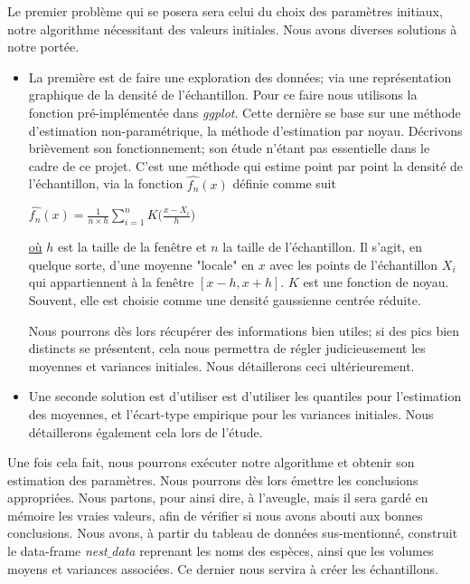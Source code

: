 \documentclass[frenchb]{report}
\newcommand{\1}{\mathbbm{1}}
\theoremstyle{definition}\newtheorem{defn}{Définition}
\theoremstyle{definition}\newtheorem{exm}{Exemple}
\theoremstyle{definition}\newtheorem{nota}{Notation}
\theoremstyle{definition}\newtheorem{rem}{Remarque}
\begin{document}
Le premier problème qui se posera sera celui du choix des paramètres initiaux, notre algorithme nécessitant des valeurs initiales. Nous avons diverses solutions à notre portée.
\begin{itemize}[label=\adfflowerleft]
\item La première est de faire une exploration des données; via une représentation graphique de la densité de l'échantillon. Pour ce faire nous utilisons la fonction pré-implémentée dans \textit{ggplot}. Cette dernière se base sur une méthode d'estimation non-paramétrique, la méthode d'estimation par noyau. Décrivons brièvement son fonctionnement; son étude n'étant pas essentielle dans le cadre de ce projet. C'est une méthode qui estime point par point la densité de l'échantillon, via la fonction $\widehat{f_n}(x)$ définie comme suit

\begin{center}
$
\widehat{f_n}(x) = \displaystyle \frac{1}{n\times h} \sum_{i=1}^n K\Big(\frac{x - X_i}{h}\Big)
$
\end{center}
\underline{où} $h$ est la taille de la fenêtre et $n$ la taille de l'échantillon. Il s'agit, en quelque sorte, d'une moyenne "locale" en $x$ avec les points de l'échantillon $X_i$ qui appartiennent à la fenêtre $[x-h, x+h]$. $K$ est une fonction de noyau. Souvent, elle est choisie comme une densité gaussienne centrée réduite.

Nous pourrons dès lors récupérer des informations bien utiles; si des pics bien distincts se présentent, cela nous permettra de régler judicieusement les moyennes et variances initiales. Nous détaillerons ceci ultérieurement. \newline
\item Une seconde solution est d'utiliser est d'utiliser les quantiles pour l'estimation des moyennes, et l'écart-type empirique pour les variances initiales. Nous détaillerons également cela lors de l'étude.
\end{itemize}

Une fois cela fait, nous pourrons exécuter notre algorithme et obtenir son estimation des paramètres. Nous pourrons dès lors émettre les conclusions appropriées.\newline
Nous partons, pour ainsi dire, à l'aveugle, mais il sera gardé en mémoire les vraies valeurs, afin de vérifier si nous avons abouti aux bonnes conclusions. \newline
Nous avons, à partir du tableau de données sus-mentionné, construit le data-frame \textit{nest$\_$data} reprenant les noms des espèces, ainsi que les volumes moyens et variances associées. Ce dernier nous servira à créer les échantillons.
\newpage
\end{document}
